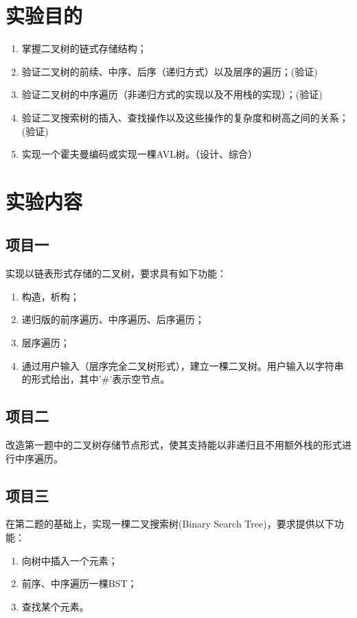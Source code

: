 \newpage
\xiaosihao
\section{实验目的}
\begin{enumerate}
\item 掌握二叉树的链式存储结构；
\item 验证二叉树的前续、中序、后序（递归方式）以及层序的遍历；(验证)
\item 验证二叉树的中序遍历（非递归方式的实现以及不用栈的实现）；(验证)
\item 验证二叉搜索树的插入、查找操作以及这些操作的复杂度和树高之间的关系；(验证)
\item 实现一个霍夫曼编码或实现一棵AVL树。（设计、综合）
\end{enumerate}

\section{实验内容}
\subsection{项目一}
实现以链表形式存储的二叉树，要求具有如下功能：
\begin{enumerate}
\item 构造，析构；
\item 递归版的前序遍历、中序遍历、后序遍历；
\item 层序遍历；
\item 通过用户输入（层序完全二叉树形式），建立一棵二叉树。用户输入以字符串的形式给出，其中'$\#$'表示空节点。
\end{enumerate}

\subsection{项目二}
改造第一题中的二叉树存储节点形式，使其支持能以非递归且不用额外栈的形式进行中序遍历。


\subsection{项目三}
在第二题的基础上，实现一棵二叉搜索树(Binary Search Tree)，要求提供以下功能：
\begin{enumerate}
\item 向树中插入一个元素；
\item 前序、中序遍历一棵BST；
\item 查找某个元素。
\end{enumerate}

